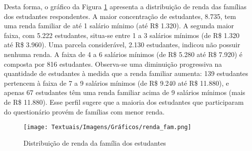 

Desta forma, o gráfico da Figura \ref{fig:renda_fam} apresenta a distribuição de renda das famílias dos estudantes respondentes. A maior concentração de estudantes, 8.735, tem uma renda familiar de até 1 salário mínimo (até R\$ 1.320). A segunda maior faixa, com 5.222 estudantes, situa-se entre 1 a 3 salários mínimos (de R\$ 1.320 até R\$ 3.960). Uma parcela considerável, 2.130 estudantes, indicou não possuir nenhuma renda. A faixa de 4 a 6 salários mínimos (de R\$ 5.280 até R\$ 7.920) é composta por 816 estudantes. Observa-se uma diminuição progressiva na quantidade de estudantes à medida que a renda familiar aumenta: 139 estudantes pertencem à faixa de 7 a 9 salários mínimos (de R\$ 9.240 até R\$ 11.880), e apenas 67 estudantes têm uma renda familiar acima de 9 salários mínimos (mais de R\$ 11.880). Esse perfil sugere que a maioria dos estudantes que participaram do questionário provém de famílias com menor renda.


\begin{figure}[ht!]
    \centering
    \caption{Distribuição de renda da família dos estudantes}
    \texttt{[image: Textuais/Imagens/Gráficos/renda\_fam.png]}
    \label{fig:renda_fam}
\end{figure}



